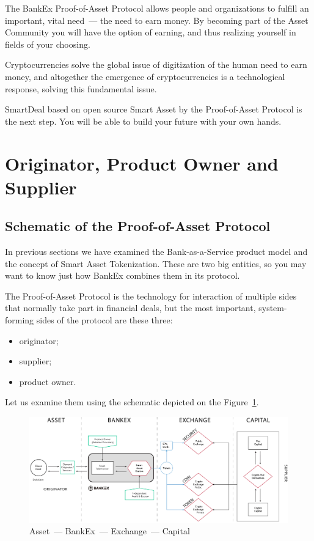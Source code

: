 \documentclass{article}
\begin{document}
\begin{multicols}{2}
The BankEx Proof-of-Asset Protocol allows people and organizations to fulfill an important, vital need~--- the need to earn money. By becoming part of the Asset Community you will have the option of earning, and thus realizing yourself in fields of your choosing. 

Cryptocurrencies solve the global issue of digitization of the human need to earn money, and altogether the emergence of cryptocurrencies is a technological response, solving this fundamental issue. 

SmartDeal based on open source Smart Asset by the Proof-of-Asset Protocol is the next step. You will be able to build your future with your own hands.

\section{Originator, Product Owner and Supplier}

\subsection{Schematic of the Proof-of-Asset Protocol} \label{sec:proof-of-asset-schematic}

In previous sections we have examined the Bank-as-a-Service product model and the concept of Smart Asset Tokenization. These are two big entities, so you may want to know just how BankEx combines them in its protocol.

The Proof-of-Asset Protocol is the technology for interaction of multiple sides that normally take part in financial deals, but the most important, system-forming sides of the protocol are these three:
	
\begin{itemize}
\item originator;
\item supplier;
\item product owner.
\end{itemize}

Let us examine them using the schematic depicted on the Figure~\ref{fig:asset-bankex-exchange-capital}.

\begin{figure}
  \centering
  \includegraphics[width=\textwidth]{asset-bankex-exchange-capital.png}
  \caption{Asset~--- BankEx~--- Exchange~--- Capital}
  \label{fig:asset-bankex-exchange-capital}
\end{figure}


\end{multicols}
\end{document}
